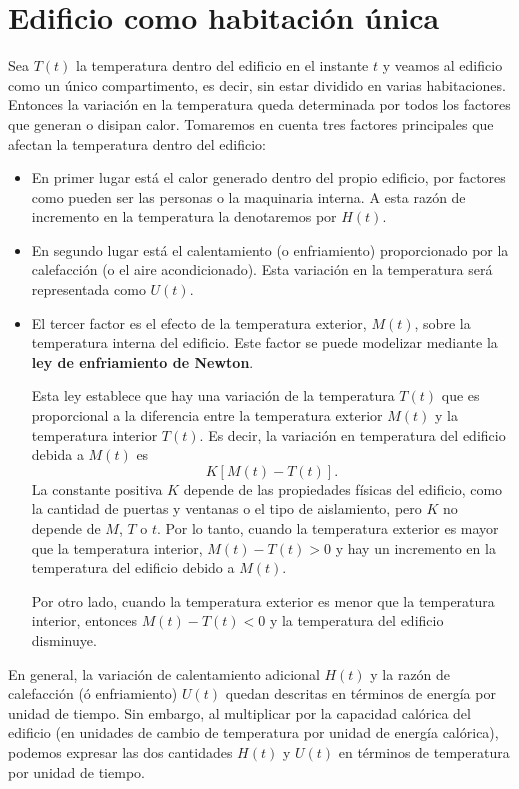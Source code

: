 \section{Edificio como habitación única}
Sea $T(t)$ la temperatura dentro del edificio en el instante $t$ y veamos al edificio como un único compartimento, es decir, sin estar dividido en varias habitaciones. Entonces la variación en la temperatura queda determinada por todos los factores que generan o disipan calor. Tomaremos en cuenta tres factores principales que afectan la temperatura dentro del edificio:
\begin{itemize}
	\item En primer lugar está el calor generado dentro del propio edificio, por factores como pueden ser las personas o la maquinaria interna. A esta razón de incremento en la temperatura la denotaremos por $H(t)$.
	\item En segundo lugar está el calentamiento (o enfriamiento) proporcionado por la calefacción (o el aire acondicionado). Esta variación en la temperatura será representada como $U(t)$.
	\item El tercer factor es el efecto de la temperatura exterior, $M(t)$, sobre la temperatura interna del edificio. Este factor se puede modelizar mediante la \textbf{ley de enfriamiento de Newton}.
	
	Esta ley establece que hay una variación de la temperatura $T(t)$ que es proporcional a la diferencia entre la temperatura exterior $M(t)$ y la temperatura interior $T(t)$. Es decir, la variación en temperatura del edificio debida a $M(t)$ es 
	\begin{equation}
		K[M(t) - T(t)].
	\end{equation}
	La constante positiva $K$ depende de las propiedades físicas del edificio, como la cantidad de puertas y ventanas o el tipo de aislamiento, pero $K$ no depende de $M$, $T$ o $t$. Por lo tanto, cuando la temperatura exterior es mayor que la temperatura interior, $M(t) - T(t) > 0$ y hay un incremento en la temperatura del edificio debido a $M(t)$. 
	
	Por otro lado, cuando la temperatura exterior es menor que la temperatura interior, entonces $M(t) - T(t) < 0$ y la temperatura del edificio disminuye.
\end{itemize}
En general, la variación de calentamiento adicional $H(t)$ y la razón de calefacción
(ó enfriamiento) $U(t)$ quedan descritas en términos de energía por unidad de tiempo. Sin embargo, al multiplicar por la
capacidad calórica del edificio (en unidades de cambio de temperatura por unidad de energía calórica), podemos expresar las dos cantidades $H(t)$ y $U(t)$ en términos de temperatura por unidad de tiempo.

